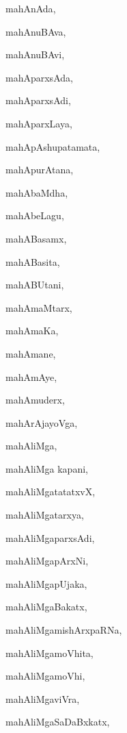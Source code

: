 \begin{multicols}{2}
{mahAnAda}, \pageref{mahAnAda}

{mahAnuBAva}, \pageref{mahAnuBAva}

{mahAnuBAvi}, \pageref{mahAnuBAvi}

{mahAparxsAda}, \pageref{mahAparxsAda}

{mahAparxsAdi}, \pageref{mahAparxsAdi}

{mahAparxLaya}, \pageref{mahAparxLaya}

{mahApAshupatamata}, \pageref{mahApAshupatamata}

{mahApurAtana}, \pageref{mahApurAtana}

{mahAbaMdha}, \pageref{mahAbaMdha}

{mahAbeLagu}, \pageref{mahAbeLagu}

{mahABasamx}, \pageref{mahABasamx}

{mahABasita}, \pageref{mahABasita}

{mahABUtani}, \pageref{mahABUtani}

{mahAmaMtarx}, \pageref{mahAmaMtarx}

{mahAmaKa}, \pageref{mahAmaKa}

{mahAmane}, \pageref{mahAmane}

{mahAmAye}, \pageref{mahAmAye}

{mahAmuderx}, \pageref{mahAmuderx}

{mahArAjayoVga}, \pageref{mahArAjayoVga}

{mahAliMga}, \pageref{mahAliMga}

{mahAliMga kapani}, \pageref{mahAliMga kapani}

{mahAliMgatatatxvX}, \pageref{mahAliMgatatatxvX}

{mahAliMgatarxya}, \pageref{mahAliMgatarxya}

{mahAliMgaparxsAdi}, \pageref{mahAliMgaparxsAdi}

{mahAliMgapArxNi}, \pageref{mahAliMgapArxNi}

{mahAliMgapUjaka}, \pageref{mahAliMgapUjaka}

{mahAliMgaBakatx}, \pageref{mahAliMgaBakatx}

{mahAliMgamishArxpaRNa}, \pageref{mahAliMgamishArxpaRNa}

{mahAliMgamoVhita}, \pageref{mahAliMgamoVhita}

{mahAliMgamoVhi}, \pageref{mahAliMgamoVhi}

{mahAliMgaviVra}, \pageref{mahAliMgaviVra}

{mahAliMgaSaDaBxkatx}, \pageref{mahAliMgaSaDaBxkatx}


\end{multicols}
